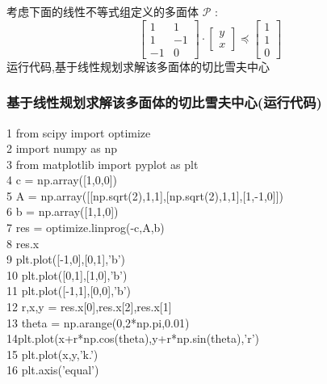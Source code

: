 \documentclass[handout]{beamer}
\begin{document}
\begin{frame}
\begin{frame}
		考虑下面的线性不等式组定义的多面体 $\mathcal{P}$ :
		$$
		\left[\begin{array}{cc}
			1 & 1 \\
			1 & -1 \\
			-1 & 0
		\end{array}\right] \cdot\left[\begin{array}{l}
			y \\
			x
		\end{array}\right] \preccurlyeq\left[\begin{array}{l}
			1 \\
			1 \\
			0
		\end{array}\right]
		$$
	 运行代码,基于线性规划求解该多面体的切比雪夫中心
		\end{frame}
		
		\begin{frame}
		\frametitle{基于线性规划求解该多面体的切比雪夫中心(运行代码)}
		\small{
		1 from scipy import optimize\\
		2 import numpy as np\\
		3 from matplotlib import pyplot as plt\\
		4 c = np.array([1,0,0])\\
		5 A = np.array([[np.sqrt(2),1,1],[np.sqrt(2),1,1],[1,-1,0]])\\
		6 b = np.array([1,1,0])\\
		7 res = optimize.linprog(-c,A,b)\\
		8 res.x\\
		9 plt.plot([-1,0],[0,1],'b')\\
		10 plt.plot([0,1],[1,0],'b')\\
		11 plt.plot([-1,1],[0,0],'b')\\
		12 r,x,y = res.x[0],res.x[2],res.x[1]\\
		13 theta = np.arange(0,2*np.pi,0.01)\\
		14plt.plot(x+r*np.cos(theta),y+r*np.sin(theta),'r')\\
		15 plt.plot(x,y,'k.')\\
		16 plt.axis('equal')\\
		}
	   	\end{frame}
	

\end{frame}
\end{document}
